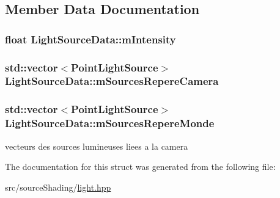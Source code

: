 \subsection{Member Data Documentation}
\hypertarget{struct_light_source_data_a7571892de2637c65348ab3fc7308ba7d}{
\subsubsection[{m\+Intensity}]{\setlength{\rightskip}{0pt plus 5cm}float Light\+Source\+Data\+::m\+Intensity}}\label{struct_light_source_data_a7571892de2637c65348ab3fc7308ba7d}
\hypertarget{struct_light_source_data_a417d68f7115516f98c7e73f2c842bdfe}{
\subsubsection[{m\+Sources\+Repere\+Camera}]{\setlength{\rightskip}{0pt plus 5cm}std\+::vector$<${\bf Point\+Light\+Source}$>$ Light\+Source\+Data\+::m\+Sources\+Repere\+Camera}}\label{struct_light_source_data_a417d68f7115516f98c7e73f2c842bdfe}
\hypertarget{struct_light_source_data_a0a57718838c562b42402e732685fd334}{
\subsubsection[{m\+Sources\+Repere\+Monde}]{\setlength{\rightskip}{0pt plus 5cm}std\+::vector$<${\bf Point\+Light\+Source}$>$ Light\+Source\+Data\+::m\+Sources\+Repere\+Monde}}\label{struct_light_source_data_a0a57718838c562b42402e732685fd334}


vecteurs des sources lumineuses liees a la camera 



The documentation for this struct was generated from the following file\+:\begin{DoxyCompactItemize}
\item 
src/source\+Shading/\hyperlink{light_8hpp}{light.\+hpp}\end{DoxyCompactItemize}
